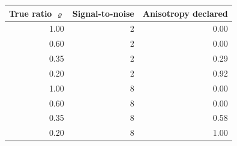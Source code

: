 \begin{tabular}{rrr}
\toprule
True ratio $\varrho$ & Signal-to-noise & Anisotropy declared \\
\midrule
1.00 & 2 & 0.00 \\
0.60 & 2 & 0.00 \\
0.35 & 2 & 0.29 \\
0.20 & 2 & 0.92 \\
1.00 & 8 & 0.00 \\
0.60 & 8 & 0.00 \\
0.35 & 8 & 0.58 \\
0.20 & 8 & 1.00 \\
\bottomrule
\end{tabular}
